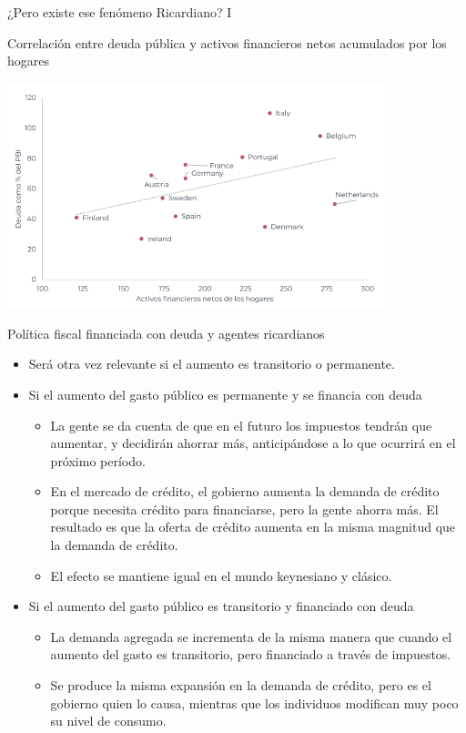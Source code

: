 \documentclass{beamer}
\begin{document}
\begin{frame}{¿Pero existe ese fenómeno Ricardiano? I}
    \begin{center}
        Correlación entre deuda pública y activos financieros netos acumulados por los hogares
    \end{center}
    \centering\includegraphics[width=11cm]{../Figures/C41.6.png}\  
\end{frame}

    
\begin{frame}{Política fiscal financiada con deuda y agentes ricardianos}
    
    \begin{itemize}
        \item Será otra vez relevante si el aumento es transitorio o permanente.
        \item Si el aumento del gasto público es permanente y se financia con deuda
        \begin{itemize}
            \item La gente se da cuenta de que en el futuro los impuestos tendrán que
            aumentar, y decidirán ahorrar más, anticipándose a lo que ocurrirá en
            el próximo período.
            \item En el mercado de crédito, el gobierno aumenta la
            demanda de crédito porque necesita crédito para financiarse, pero la
            gente ahorra más. El resultado es que la oferta de crédito aumenta en
            la misma magnitud que la demanda de crédito.
            \item El efecto se mantiene igual en el mundo keynesiano y clásico.
        \end{itemize}
        \item Si el aumento del gasto público es transitorio y financiado con deuda
        \begin{itemize}
            \item La demanda agregada se incrementa de la misma manera que cuando el aumento del gasto es transitorio, pero
            financiado a través de impuestos.
            \item Se produce la misma expansión en la demanda de crédito, pero es
            el gobierno quien lo causa, mientras que los individuos modifican muy
            poco su nivel de consumo.
        \end{itemize}
    \end{itemize}

\end{frame}
\end{document}
